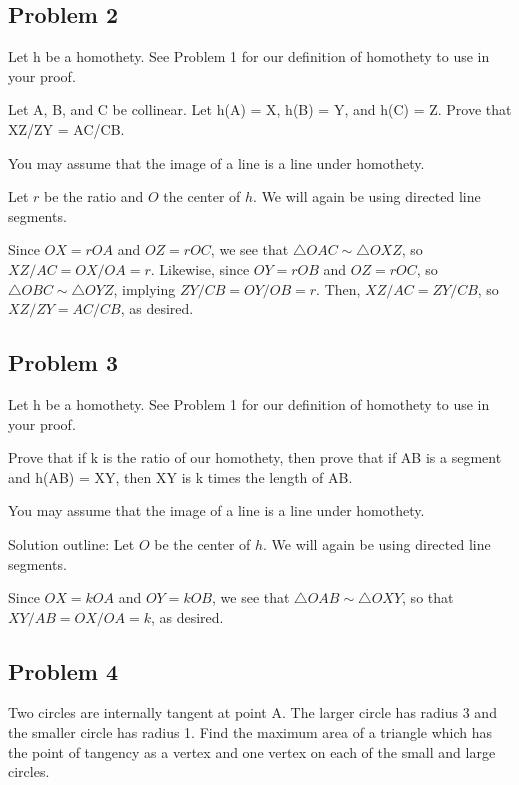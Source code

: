 \subsection{Problem 2}

Let h be a homothety. See Problem 1 for our definition of homothety to use in your proof.

Let A, B, and C be collinear. Let h(A) = X, h(B) = Y, and h(C) = Z. Prove that XZ/ZY = AC/CB.

You may assume that the image of a line is a line under homothety.

\begin{mdsoln}
Let $r$ be the ratio and $O$ the center of $h$. We will again be using directed line segments.

Since $OX=rOA$ and $OZ=rOC$, we see that $\triangle OAC\sim \triangle OXZ$, so $XZ/AC=OX/OA=r$. Likewise, since $OY=rOB$ and $OZ=rOC$, so $\triangle OBC\sim \triangle OYZ$, implying $ZY/CB=OY/OB=r$. Then, $XZ/AC=ZY/CB$, so $XZ/ZY=AC/CB$, as desired.
    
\end{mdsoln}

\subsection{Problem 3}

Let h be a homothety. See Problem 1 for our definition of homothety to use in your proof.

Prove that if k is the ratio of our homothety, then prove that if AB is a segment and h(AB) = XY, then XY is k times the length of AB.

You may assume that the image of a line is a line under homothety.

\begin{mdsoln}
Solution outline:
Let $O$ be the center of $h$. We will again be using directed line segments.

Since $OX=kOA$ and $OY=kOB$, we see that $\triangle OAB\sim \triangle OXY$, so that $XY/AB=OX/OA=k$, as desired.
    
\end{mdsoln}


\subsection{Problem 4}

Two circles are internally tangent at point A. The larger circle has radius 3 and the smaller circle has radius 1. Find the maximum area of a triangle which has the point of tangency as a vertex and one vertex on each of the small and large circles.

